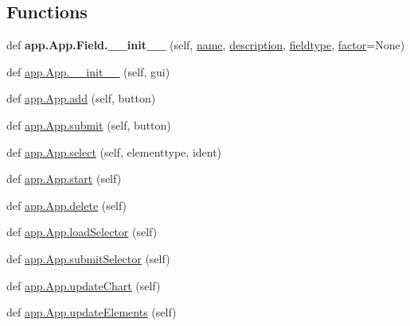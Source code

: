 \subsection*{Functions}
\begin{DoxyCompactItemize}
\item 
\mbox{\label{group___g_u_i_ga64a75d6222ef9c54ddb846ecadd21336}} 
def {\bfseries app.\+App.\+Field.\+\_\+\+\_\+init\+\_\+\+\_\+} (self, \hyperlink{group___g_u_i_ga74bf1ee16d2de49ee707cab9ecba123b}{name}, \hyperlink{group___g_u_i_gadd42fca0c131874daa29902266d514cd}{description}, \hyperlink{group___g_u_i_ga2b84546c227ee521e1a4776cd07aabe8}{fieldtype}, \hyperlink{group___g_u_i_ga6a50e1c443b963d286ed393be38e00fd}{factor}=None)
\item 
def \hyperlink{group___g_u_i_ga7ebfdd74ff42ca9b5c1dd6383b4641f8}{app.\+App.\+\_\+\+\_\+init\+\_\+\+\_\+} (self, gui)
\item 
def \hyperlink{group___g_u_i_ga12410afa08ea83e0e75958316f3bfa44}{app.\+App.\+add} (self, button)
\item 
def \hyperlink{group___g_u_i_ga5fa0636a03dcc38bf7bcf219d27167ca}{app.\+App.\+submit} (self, button)
\item 
def \hyperlink{group___g_u_i_gaa1a0515399dab21f9b6e5c075f549312}{app.\+App.\+select} (self, elementtype, ident)
\item 
def \hyperlink{group___g_u_i_ga9e6225026b8708f880e1f4679ca94eec}{app.\+App.\+start} (self)
\item 
def \hyperlink{group___g_u_i_ga11694b61d1b324b5628ca9b110990451}{app.\+App.\+delete} (self)
\item 
def \hyperlink{group___g_u_i_gaeee64598c3249a2d0bb2bcae96a5372e}{app.\+App.\+load\+Selector} (self)
\item 
def \hyperlink{group___g_u_i_gae9b8c9daf8c301d4ff545148989984b3}{app.\+App.\+submit\+Selector} (self)
\item 
def \hyperlink{group___g_u_i_ga8f0a02d26fd64277f30a700190bdc9f2}{app.\+App.\+update\+Chart} (self)
\item 
def \hyperlink{group___g_u_i_ga9ff44df3681a65aeaf309207a69c17bb}{app.\+App.\+update\+Elements} (self)
\end{DoxyCompactItemize}
